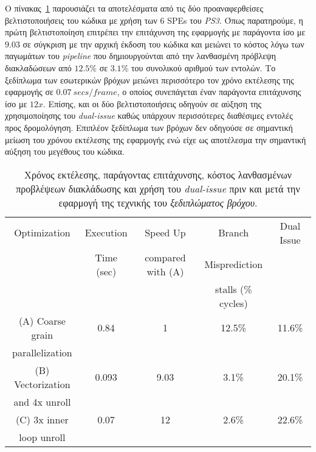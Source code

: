 Ο πίνακας~\ref{table:tab41} παρουσιάζει τα αποτελέσματα από τις δύο προαναφερθείσες βελτιστοποιήσεις του κώδικα με χρήση των \(6\) \acp{SPE} του \textsl{PS3}. Όπως παρατηρούμε, η πρώτη βελτιστοποίηση επιτρέπει την επιτάχυνση της εφαρμογής με παράγοντα ίσο με \(9.03\) σε σύγκριση με την αρχική έκδοση του κώδικα και μειώνει το κόστος λόγω των παγωμάτων του \textsl{pipeline} που δημιουργούνται από την λανθασμένη πρόβλεψη διακλαδώσεων από \(12.5\%\) σε \(3.1\%\) του συνολικού αριθμού των εντολών. Το ξεδίπλωμα των εσωτερικών βρόχων μειώνει περισσότερο τον χρόνο εκτέλεσης της εφαρμογής σε \(0.07\ secs/frame\), ο οποίος συνεπάγεται έναν παράγοντα επιτάχυνσης ίσο με \(12x\). Επίσης, και οι δύο βελτιστοποιήσεις οδηγούν σε αύξηση της χρησιμοποίησης του \textsl{dual-issue} καθώς υπάρχουν περισσότερες διαθέσιμες εντολές προς δρομολόγηση. Επιπλέον ξεδίπλωμα των βρόχων δεν οδηγούσε σε σημαντική μείωση του χρόνου εκτέλεσης της εφαρμογής ενώ είχε ως αποτέλεσμα την σημαντική αύξηση του μεγέθους του κώδικα.
\begin{table}
\centering
\begin{tabular}{|c|c|c|c|c|}
\hline
Optimization & Execution & Speed Up & Branch & Dual Issue \\
             & Time (sec) & compared with (A) & Misprediction & \\
             &                      &          & stalls (\% cycles) & \\ \hline
(A) Coarse grain & 0.84 & 1 & 12.5\% & 11.6\% \\
parallelization  &      &   &        & \\ \hline
(B) Vectorization & 0.093 & 9.03 & 3.1\% & 20.1\%\\
and 4x unroll     &       &      &       & \\ \hline
(C) 3x inner & 0.07 & 12 & 2.6\% & 22.6\%\\
loop unroll  &      &    &       & \\ \hline
\end{tabular}
\caption{Χρόνος εκτέλεσης, παράγοντας επιτάχυνσης, κόστος λανθασμένων προβλέψεων διακλάδωσης και χρήση του \textsl{dual-issue} πριν και μετά την εφαρμογή της τεχνικής του \textsl{ξεδιπλώματος βρόχου}.}
\label{table:tab41}
\end{table}
\indent

